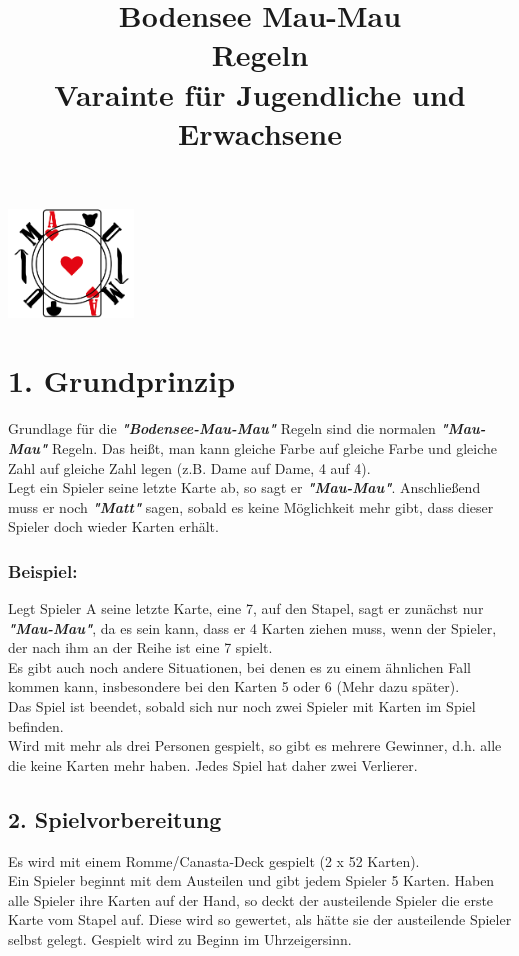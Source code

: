 \documentclass{article}
\title{Bodensee Mau-Mau \\ Regeln \\ Varainte für Jugendliche und Erwachsene}
\begin{document}
\maketitle
\begin{center}
\includegraphics[width=0.25\textwidth]{photos/logo.png}
\end{center}

\section*{1. Grundprinzip}
Grundlage für die \textit{\textbf{"Bodensee-Mau-Mau"}} Regeln sind die normalen \textit{\textbf{"Mau-Mau"}} Regeln. Das heißt, man kann gleiche Farbe auf gleiche Farbe und gleiche Zahl auf gleiche Zahl legen (z.B. Dame auf
Dame, 4 auf 4). \\
Legt ein Spieler seine letzte Karte ab, so sagt er \textit{\textbf{"Mau-Mau"}}. Anschließend muss er noch  \textbf{\textit{"Matt"}} sagen, sobald es keine Möglichkeit mehr gibt, dass dieser Spieler doch wieder Karten erhält.
\subsubsection*{Beispiel:}
Legt Spieler A seine letzte Karte, eine 7, auf den Stapel, sagt er zunächst nur \textit{\textbf{"Mau-Mau"}}, da es sein kann, dass er 4 Karten ziehen muss, wenn der Spieler, der nach ihm an der Reihe ist eine 7 spielt. \\
Es gibt auch noch andere Situationen, bei denen es zu einem ähnlichen Fall kommen kann, insbesondere bei den Karten 5 oder 6 (Mehr dazu später). \\
Das Spiel ist beendet, sobald sich nur noch zwei Spieler mit Karten im Spiel befinden. \\ Wird mit mehr als drei Personen gespielt, so gibt es mehrere Gewinner, d.h. alle die keine Karten mehr haben. Jedes Spiel hat daher zwei Verlierer.
\subsection*{2. Spielvorbereitung}
Es wird mit einem Romme/Canasta-Deck gespielt (2 x 52 Karten). \\ Ein Spieler beginnt mit dem Austeilen und gibt jedem Spieler 5 Karten. Haben alle Spieler ihre Karten auf der Hand, so deckt der austeilende Spieler die erste Karte vom Stapel auf. Diese wird so gewertet, als hätte sie der austeilende Spieler selbst gelegt. Gespielt wird zu Beginn im Uhrzeigersinn. \\
\end{document}
